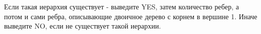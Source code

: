 Если такая иерархия существует - выведите YES, затем количество ребер, а потом и сами ребра, описывающие двоичное дерево с корнем в вершине 1. Иначе выведите NO, если не существует такой иерархии.